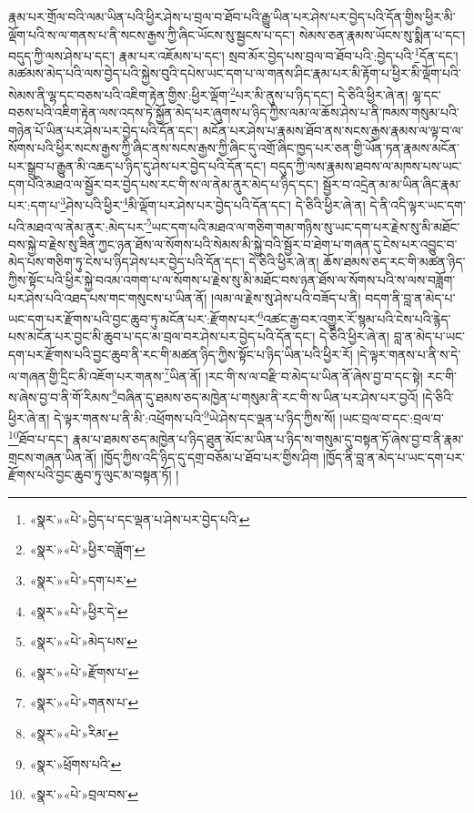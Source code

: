 རྣམ་པར་གྲོལ་བའི་ལམ་ཡིན་པའི་ཕྱིར་ཤེས་པ་བྲལ་བ་ཐོབ་པའི་རྒྱུ་ཡིན་པར་ཤེས་པར་བྱེད་པའི་དོན་གྱིས་ཕྱིར་མི་ལྡོག་པའི་ས་ལ་གནས་པ་ནི་སངས་རྒྱས་ཀྱི་ཞིང་ཡོངས་སུ་སྦྱངས་པ་དང་། སེམས་ཅན་རྣམས་ཡོངས་སུ་སྨིན་པ་དང་། བདུད་ཀྱི་ལས་ཤེས་པ་དང་། རྣམ་པར་འཇོམས་པ་དང་། སྲབ་མོར་བྱེད་པས་བྲལ་བ་ཐོབ་པའི་:བྱེད་པའི་\footnote{«སྣར་»«པེ་»བྱེད་པ་དང་ལྡན་པ་ཤེས་པར་བྱེད་པའི་}དོན་དང་། མཚམས་མེད་པའི་ལས་བྱེད་པའི་སྐྱེས་བུའི་དཔེས་ཡང་དག་པ་ལ་གནས་ཤིང་རྣམ་པར་མི་རྟོག་པ་ཕྱིར་མི་ལྡོག་པའི་སེམས་ནི་ལྷ་དང་བཅས་པའི་འཇིག་རྟེན་གྱིས་:ཕྱིར་ལྡོག་\footnote{«སྣར་»«པེ་»ཕྱིར་བཟློག་}པར་མི་ནུས་པ་ཉིད་དང་། དེ་ཅིའི་ཕྱིར་ཞེ་ན། ལྷ་དང་བཅས་པའི་འཇིག་རྟེན་ལས་འདས་ཏེ་སྐྱོན་མེད་པར་ཞུགས་པ་ཉིད་ཀྱིས་ལམ་ལ་ཆོས་ཤེས་པ་ནི་ཁམས་གསུམ་པའི་གཉེན་པོ་ཡིན་པར་ཤེས་པར་བྱེད་པའི་དོན་དང་། མངོན་པར་ཤེས་པ་རྣམས་ཐོབ་ནས་སངས་རྒྱས་རྣམས་ལ་ལྟ་བ་ལ་སོགས་པའི་ཕྱིར་སངས་རྒྱས་ཀྱི་ཞིང་ནས་སངས་རྒྱས་ཀྱི་ཞིང་དུ་འགྲོ་ཞིང་ཁྱད་པར་ཅན་གྱི་ཡོན་ཏན་རྣམས་མངོན་པར་སྒྲུབ་པ་རྒྱུན་མི་འཆད་པ་ཉིད་དུ་ཤེས་པར་བྱེད་པའི་དོན་དང་། བདུད་ཀྱི་ལས་རྣམས་ཐབས་ལ་མཁས་པས་ཡང་དག་པའི་མཐའ་ལ་སྦྱོར་བར་བྱེད་པས་རང་གི་ས་ལ་ནེམ་ནུར་མེད་པ་ཉིད་དང་། སྦྱོར་བ་འདྲེན་མ་མ་ཡིན་ཞིང་རྣམ་པར་:དག་པ་\footnote{«སྣར་»«པེ་»དག་པར་}ཤེས་པའི་ཕྱིར་\footnote{«སྣར་»«པེ་»ཕྱིར་དེ་}མི་ལྡོག་པར་ཤེས་པར་བྱེད་པའི་དོན་དང་། དེ་ཅིའི་ཕྱིར་ཞེ་ན། དེ་ནི་འདི་ལྟར་ཡང་དག་པའི་མཐའ་ལ་ནེམ་ནུར་:མེད་པར་\footnote{«སྣར་»«པེ་»མེད་པས་}ཡང་དག་པའི་མཐའ་ལ་གཅིག་གམ་གཉིས་སུ་ཡང་དག་པར་རྗེས་སུ་མི་མཐོང་བས་སྐྱེ་བ་རྗེས་སུ་ཟིན་ཀྱང་ཉན་ཐོས་ལ་སོགས་པའི་སེམས་མི་སྐྱེ་བའི་སྦྱོར་བ་ཐེག་པ་གཞན་དུ་ངེས་པར་འབྱུང་བ་མེད་པས་གཅིག་ཏུ་ངེས་པ་ཉིད་ཤེས་པར་བྱེད་པའི་དོན་དང་། དེ་ཅིའི་ཕྱིར་ཞེ་ན། ཆོས་ཐམས་ཅད་རང་གི་མཚན་ཉིད་ཀྱིས་སྟོང་པའི་ཕྱིར་སྐྱེ་བའམ་འགག་པ་ལ་སོགས་པ་རྗེས་སུ་མི་མཐོང་བས་ཉན་ཐོས་ལ་སོགས་པའི་ས་ལས་བཟློག་པར་ཤེས་པའི་འཐད་པས་གང་གསུངས་པ་ཡིན་ནོ། །ལམ་ལ་རྗེས་སུ་ཤེས་པའི་བཟོད་པ་ནི། བདག་ནི་བླ་ན་མེད་པ་ཡང་དག་པར་རྫོགས་པའི་བྱང་ཆུབ་ཏུ་མངོན་པར་:རྫོགས་པར་\footnote{«སྣར་»«པེ་»རྫོགས་པ་}འཚང་རྒྱ་བར་འགྱུར་རོ་སྙམ་པའི་ངེས་པའི་རྙེད་པས་མངོན་པར་བྱང་མི་ཆུབ་པ་དང་མ་བྲལ་བར་ཤེས་པར་བྱེད་པའི་དོན་དང་། དེ་ཅིའི་ཕྱིར་ཞེ་ན། བླ་ན་མེད་པ་ཡང་དག་པར་རྫོགས་པའི་བྱང་ཆུབ་ནི་རང་གི་མཚན་ཉིད་ཀྱིས་སྟོང་པ་ཉིད་ཡིན་པའི་ཕྱིར་རོ། །དེ་ལྟར་གནས་པ་ནི་ས་དེ་ལ་གཞན་གྱི་དྲིང་མི་འཇོག་པར་གནས་\footnote{«སྣར་»«པེ་»གནས་པ་}ཡིན་ནོ། །རང་གི་ས་ལ་བརྫི་བ་མེད་པ་ཡིན་ནོ་ཞེས་བྱ་བ་དང་སྟེ། རང་གི་ས་ཞེས་བྱ་བ་ནི་གོ་རིམས་\footnote{«སྣར་»«པེ་»རིམ་}བཞིན་དུ་ཐམས་ཅད་མཁྱེན་པ་གསུམ་ནི་རང་གི་ས་ཡིན་པར་ཤེས་པར་བྱའོ། །དེ་ཅིའི་ཕྱིར་ཞེ་ན། དེ་ལྟར་གནས་པ་ནི་མི་:འཕྲོགས་པའི་\footnote{«སྣར་»ཕྲོགས་པའི་}ཡེ་ཤེས་དང་ལྡན་པ་ཉིད་ཀྱིས་སོ། །ཡང་བྲལ་བ་དང་:བྲལ་བ་\footnote{«སྣར་»«པེ་»བྲལ་བས་}ཐོབ་པ་དང་། རྣམ་པ་ཐམས་ཅད་མཁྱེན་པ་ཉིད་ཐུན་མོང་མ་ཡིན་པ་ཉིད་ས་གསུམ་དུ་བསྟན་ཏོ་ཞེས་བྱ་བ་ནི་རྣམ་གྲངས་གཞན་ཡིན་ནོ། །ཁྱོད་ཀྱིས་འདི་ཉིད་དུ་དགྲ་བཅོམ་པ་ཐོབ་པར་གྱིས་ཤིག །ཁྱོད་ནི་བླ་ན་མེད་པ་ཡང་དག་པར་རྫོགས་པའི་བྱང་ཆུབ་ཏུ་ལུང་མ་བསྟན་ཏོ། །
